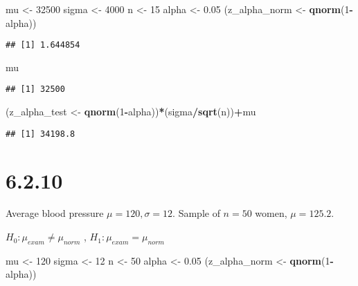 \documentclass[]{article}
\newenvironment{Shaded}{\begin{snugshade}}{\end{snugshade}}
\newcommand{\KeywordTok}[1]{\textcolor[rgb]{0.13,0.29,0.53}{\textbf{#1}}}
\newcommand{\DecValTok}[1]{\textcolor[rgb]{0.00,0.00,0.81}{#1}}
\newcommand{\FloatTok}[1]{\textcolor[rgb]{0.00,0.00,0.81}{#1}}
\newcommand{\StringTok}[1]{\textcolor[rgb]{0.31,0.60,0.02}{#1}}
\newcommand{\OperatorTok}[1]{\textcolor[rgb]{0.81,0.36,0.00}{\textbf{#1}}}
\newcommand{\NormalTok}[1]{#1}
\begin{document}
\begin{Shaded}
\begin{Highlighting}[]
\NormalTok{mu <-}\StringTok{ }\DecValTok{32500}
\NormalTok{sigma <-}\StringTok{ }\DecValTok{4000}
\NormalTok{n <-}\StringTok{ }\DecValTok{15}
\NormalTok{alpha <-}\StringTok{ }\FloatTok{0.05}
\NormalTok{(z_alpha_norm <-}\StringTok{ }\KeywordTok{qnorm}\NormalTok{(}\DecValTok{1}\OperatorTok{-}\NormalTok{alpha))}
\end{Highlighting}
\end{Shaded}

\begin{verbatim}
## [1] 1.644854
\end{verbatim}

\begin{Shaded}
\begin{Highlighting}[]
\NormalTok{mu}
\end{Highlighting}
\end{Shaded}

\begin{verbatim}
## [1] 32500
\end{verbatim}

\begin{Shaded}
\begin{Highlighting}[]
\NormalTok{(z_alpha_test <-}\StringTok{ }\KeywordTok{qnorm}\NormalTok{(}\DecValTok{1}\OperatorTok{-}\NormalTok{alpha))}\OperatorTok{*}\NormalTok{(sigma}\OperatorTok{/}\KeywordTok{sqrt}\NormalTok{(n))}\OperatorTok{+}\NormalTok{mu}
\end{Highlighting}
\end{Shaded}

\begin{verbatim}
## [1] 34198.8
\end{verbatim}

\section{6.2.10}\label{section-3}

Average blood pressure \(\mu = 120, \sigma = 12\). Sample of \(n=50\)
women, \(\mu = 125.2\).

\(H_0:\mu_{exam}\neq\mu_{norm}\) , \(H_1:\mu_{exam}=\mu_{norm}\)

\begin{Shaded}
\begin{Highlighting}[]
\NormalTok{mu <-}\StringTok{ }\DecValTok{120}
\NormalTok{sigma <-}\StringTok{ }\DecValTok{12}
\NormalTok{n <-}\StringTok{ }\DecValTok{50}
\NormalTok{alpha <-}\StringTok{ }\FloatTok{0.05}
\NormalTok{(z_alpha_norm <-}\StringTok{ }\KeywordTok{qnorm}\NormalTok{(}\DecValTok{1}\OperatorTok{-}\NormalTok{alpha))}
\end{Highlighting}
\end{Shaded}
\end{document}
